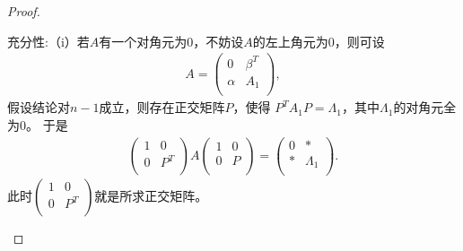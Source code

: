 \documentclass[../../main.tex]{subfiles}%
\begin{document}
\begin{proof}
\begin{enumerate}[(1)]
{\heiti 充分性:}（i）若$A$有一个对角元为$0$，不妨设$A$的左上角元为$0$，则可设
\begin{align*}
A=\begin{pmatrix}
0& \beta^T\\
\alpha& A_1\\
\end{pmatrix},
\end{align*}
假设结论对$n-1$成立，则存在正交矩阵$P$，使得
$P^TA_1P=\Lambda_1$，其中$\Lambda_1$的对角元全为$0$。
于是
\begin{align*}
\begin{pmatrix}
1& 0\\
0& P^T\\
\end{pmatrix} A \begin{pmatrix}
1& 0\\
0& P\\
\end{pmatrix} =\begin{pmatrix}
0& *\\
*& \Lambda_1\\
\end{pmatrix}.
\end{align*}
此时$\begin{pmatrix}
1& 0\\
0& P^T\\
\end{pmatrix}$就是所求正交矩阵。



\end{enumerate}
\end{proof}
\end{document}

